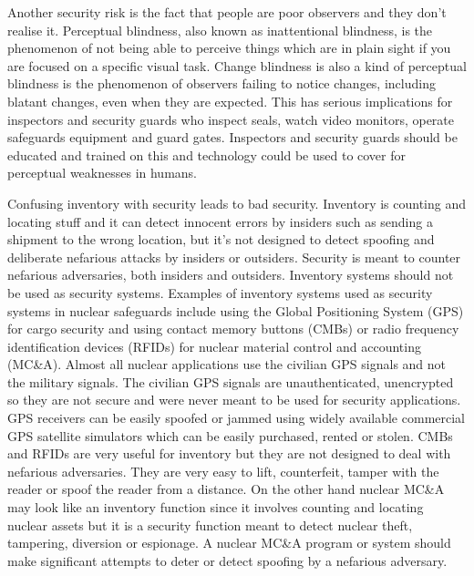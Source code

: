 \documentclass[twocolumn,a4paper]{article}
\begin{document}
Another security risk is the fact that people are poor observers and
they don't realise it. Perceptual blindness, also known as
inattentional blindness, is the phenomenon of not being able to
perceive things which are in plain sight if you are focused on a
specific visual task. Change blindness is also a kind of perceptual
blindness is the phenomenon of observers failing to notice changes,
including blatant changes, even when they are expected. This has
serious implications for inspectors and security guards who inspect
seals, watch video monitors, operate safeguards equipment and guard
gates. Inspectors and security guards should be educated and trained
on this and technology could be used to cover for perceptual
weaknesses in humans. \citep{insiderThreat2011}

Confusing inventory with security leads to bad security. Inventory is
counting and locating stuff and it can detect innocent errors by
insiders such as sending a shipment to the wrong location, but it’s
not designed to detect spoofing and deliberate nefarious attacks by
insiders or outsiders. \citep{handbookSecBlunders2010} Security is meant to counter nefarious
adversaries, both insiders and outsiders. \citep{insiderThreat2011} Inventory systems should
not be used as security systems. Examples of inventory systems used as
security systems in nuclear safeguards include using the Global
Positioning System (GPS) for cargo security and using contact memory
buttons (CMBs) or radio frequency identification devices (RFIDs) for
nuclear material control and accounting (MC\&A). \citep{handbookSecBlunders2010} Almost all
nuclear applications use the civilian GPS signals and not the military
signals.  The civilian GPS signals are unauthenticated, unencrypted so
they are not secure and were never meant to be used for security
applications. GPS receivers can be easily spoofed or jammed using
widely available commercial GPS satellite simulators which can be
easily purchased, rented or stolen. CMBs and RFIDs are very useful for
inventory but they are not designed to deal with nefarious
adversaries. They are very easy to lift, counterfeit, tamper with the
reader or spoof the reader from a distance. \citep{nuclearSafeguardsAndSec2005} On the other hand
nuclear MC\&A may look like an inventory function since it involves
counting and locating nuclear assets but it is a security function
meant to detect nuclear theft, tampering, diversion or espionage.  A
nuclear MC\&A program or system should make significant attempts to
deter or detect spoofing by a nefarious adversary. \citep{handbookSecBlunders2010}
\end{document}
